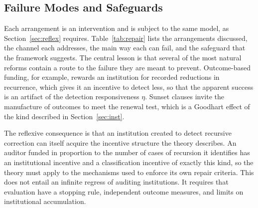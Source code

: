 \documentclass[12pt]{article}
\theoremstyle{remark}
\begin{document}
\subsection{Failure Modes and Safeguards}

Each arrangement is an intervention and is subject to the same model, as Section~\ref{sec:reflex} requires. Table~\ref{tab:repair} lists the arrangements discussed, the channel each addresses, the main way each can fail, and the safeguard that the framework suggests. The central lesson is that several of the most natural reforms contain a route to the failure they are meant to prevent. Outcome-based funding, for example, rewards an institution for recorded reductions in recurrence, which gives it an incentive to detect less, so that the apparent success is an artifact of the detection responsiveness $\eta$. Sunset clauses invite the manufacture of outcomes to meet the renewal test, which is a Goodhart effect of the kind described in Section~\ref{sec:inst}.

The reflexive consequence is that an institution created to detect recursive correction can itself acquire the incentive structure the theory describes. An auditor funded in proportion to the number of cases of recursion it identifies has an institutional incentive and a classification incentive of exactly this kind, so the theory must apply to the mechanisms used to enforce its own repair criteria. This does not entail an infinite regress of auditing institutions. It requires that evaluation have a stopping rule, independent outcome measures, and limits on institutional accumulation.
\end{document}
